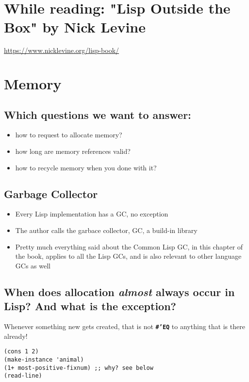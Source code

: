 \documentclass[11pt]{article}
\author{k-stz}
\date{\today}
\title{}
\begin{document}
\tableofcontents

\section{While reading: "Lisp Outside the Box" by Nick Levine}
\label{sec:orgaabcaec}
\url{https://www.nicklevine.org/lisp-book/}

\section{Memory}
\label{sec:orgc132c28}

\subsection{Which questions we want to answer:}
\label{sec:orgee885bd}
\begin{itemize}
\item how to request to allocate memory?
\item how long are memory references valid?
\item how to recycle memory when you done with it?
\end{itemize}

\subsection{Garbage Collector}
\label{sec:orgd3e05ab}
\begin{itemize}
\item Every Lisp implementation has a GC, no exception
\item The author calls the garbace collector, GC, a build-in library
\item Pretty much everything said about the Common Lisp GC, in this chapter of the book,
applies to all the Lisp GCs, and is also relevant to other language GCs as well
\end{itemize}


\subsection{When does allocation \emph{almost} always occur in Lisp? And what is the exception?}
\label{sec:org1cb5b86}
Whenever something new gets created, that is not \textbf{\texttt{\#'EQ}} to anything that is
there already!

\begin{verbatim}
(cons 1 2)
(make-instance 'animal)
(1+ most-positive-fixnum) ;; why? see below
(read-line)
\end{verbatim}
\end{document}
